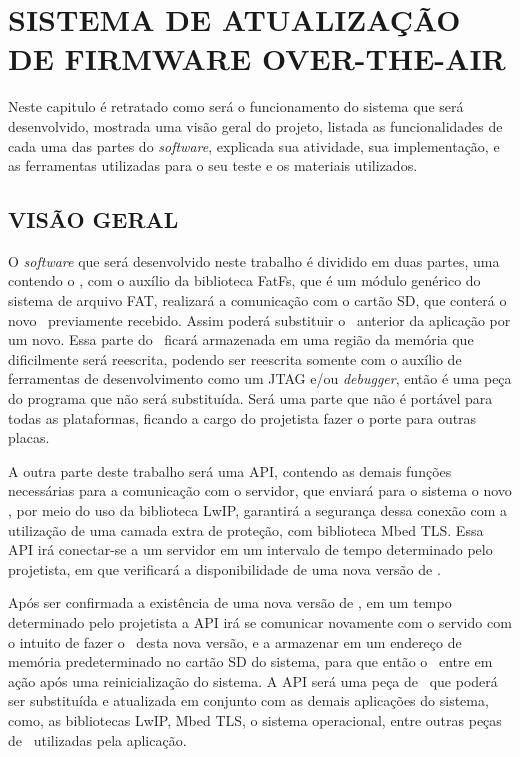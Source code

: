 
\chapter{SISTEMA DE ATUALIZAÇÃO DE FIRMWARE OVER-THE-AIR}
\label{chap:metodologia}
Neste capitulo é retratado como será o funcionamento do sistema que será desenvolvido, mostrada uma visão geral do projeto, listada as funcionalidades de cada uma das partes do \textit{software}, explicada sua atividade, sua implementação, e as ferramentas utilizadas para o seu teste e os materiais utilizados. 

\section{VISÃO GERAL}
O \textit{software} que será desenvolvido neste trabalho é dividido em duas partes, uma contendo o \bootloader, com o auxílio da biblioteca FatFs, que é um módulo genérico do sistema de arquivo FAT, realizará a comunicação com o cartão SD, que conterá o novo \firmware\ previamente recebido. Assim poderá substituir o \software\ anterior da aplicação por um novo. Essa parte do \software\ ficará armazenada em uma região da memória que dificilmente será reescrita, podendo ser reescrita somente com o auxílio de ferramentas de desenvolvimento como um JTAG e/ou \textit{debugger}, então é uma peça do programa que não será substituída. Será uma parte que não é portável para todas as plataformas, ficando a cargo do projetista fazer o porte para outras placas.

A outra parte deste trabalho será uma API, contendo as demais funções necessárias para a comunicação com o servidor, que enviará para o sistema o novo \firmware, por meio do uso da biblioteca LwIP, garantirá a segurança dessa conexão com a utilização de uma camada extra de proteção, com biblioteca Mbed TLS. Essa API irá conectar-se a um servidor em um intervalo de tempo determinado pelo projetista, em que verificará a disponibilidade de uma nova versão de \software. 

Após ser confirmada a existência de uma nova versão de \firmware, em um tempo determinado pelo projetista a API irá se comunicar novamente com o servido com o intuito de fazer o \download\ desta nova versão, e a armazenar em um endereço de memória predeterminado no cartão SD do sistema, para que então o \bootloader\ entre em ação após uma reinicialização do sistema.
A API será uma peça de \software\ que poderá ser substituída e atualizada em conjunto com as demais aplicações do sistema, como, as bibliotecas LwIP, Mbed TLS, o sistema operacional, entre outras peças de \software\ utilizadas pela aplicação. 

